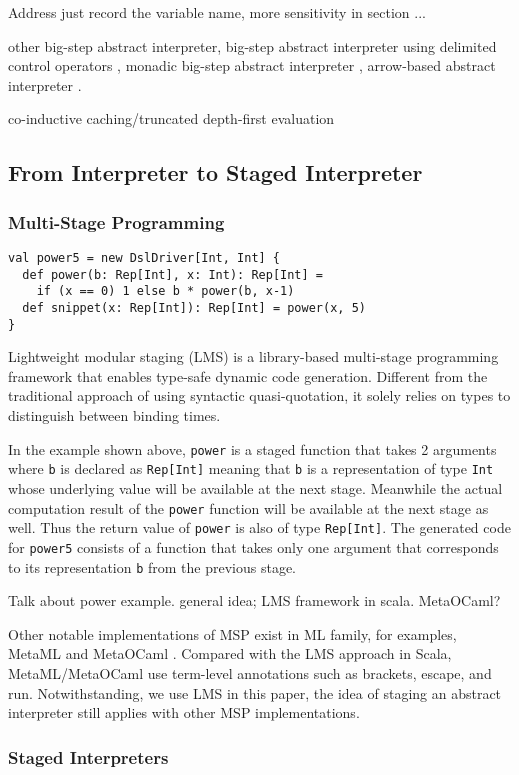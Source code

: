 Address just record the variable name, more sensitivity in section ...

other big-step abstract interpreter, 
big-step abstract interpreter using delimited control operators \cite{Wei:2018:RAA:3243631.3236800},
monadic big-step abstract interpreter \cite{DBLP:journals/pacmpl/DaraisLNH17},
arrow-based abstract interpreter \cite{Keidel:2018:CSP:3243631.3236767}.

co-inductive caching/truncated depth-first evaluation \cite{DBLP:journals/pacmpl/DaraisLNH17, Wei:2018:RAA:3243631.3236800, Rosendahl:AbsIntPL}

\subsection{From Interpreter to Staged Interpreter} \label{stagedinterp}

\subsubsection{Multi-Stage Programming}
\begin{lstlisting}
val power5 = new DslDriver[Int, Int] {
  def power(b: Rep[Int], x: Int): Rep[Int] =
    if (x == 0) 1 else b * power(b, x-1)
  def snippet(x: Rep[Int]): Rep[Int] = power(x, 5)
}
\end{lstlisting}

Lightweight modular staging (LMS)  is a library-based multi-stage programming framework 
that enables type-safe dynamic code generation. Different from the traditional approach of using
syntactic quasi-quotation, it solely relies on types to distinguish between binding times.

In the example shown above, \texttt{power} is a staged function that takes 2 arguments where 
\texttt{b} is declared as \texttt{Rep[Int]} meaning that \texttt{b} is a representation of type 
\texttt{Int} whose underlying value will be available at the next stage. Meanwhile the actual 
computation result of the \texttt{power} function  will be available at the next stage as well. 
Thus the return value of \texttt{power} is also of type \texttt{Rep[Int]}. The generated code for
\texttt{power5} consists of a function that takes only one argument that corresponds to its 
representation \texttt{b} from the previous stage.

Talk about power example. general idea; LMS framework in scala. MetaOCaml?

Other notable implementations of MSP exist in ML family, for examples, MetaML \cite{DBLP:conf/pepm/TahaS97} 
and MetaOCaml \cite{DBLP:conf/gpce/CalcagnoTHL03, DBLP:conf/flops/Kiselyov14}.
Compared with the LMS approach in Scala, MetaML/MetaOCaml use term-level annotations such as brackets, 
escape, and run. Notwithstanding, we use LMS in this paper, the idea of staging an abstract interpreter
still applies with other MSP implementations.

\subsubsection{Staged Interpreters} 
